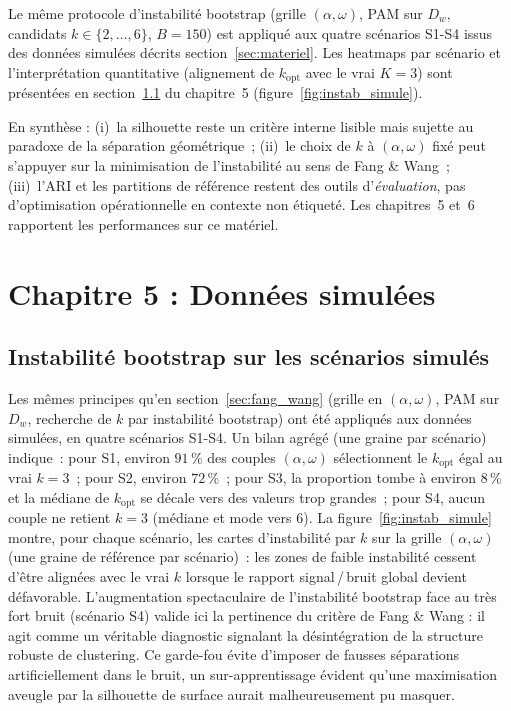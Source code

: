 \documentclass[11pt,a4paper]{article}
\newcommand{\Dw}{D_w}
\begin{document}
Le même protocole d'instabilité bootstrap (grille $(\alpha,\omega)$, PAM sur
$\Dw$, candidats $k\in\{2,\ldots,6\}$, $B=150$) est appliqué aux quatre
scénarios S1-S4 issus des données simulées décrits section~\ref{sec:materiel}. Les
heatmaps par scénario et l'interprétation quantitative (alignement de
$k_{\mathrm{opt}}$ avec le vrai $K=3$) sont présentées en
section~\ref{sec:instab_simule} du chapitre~5 (figure~\ref{fig:instab_simule}).

\medskip
\noindent
En synthèse : (i)~la silhouette reste un critère interne lisible mais sujette au
paradoxe de la séparation géométrique~; (ii)~le choix de $k$ à $(\alpha,\omega)$
fixé peut s'appuyer sur la minimisation de l'instabilité au sens de Fang \&
Wang~; (iii)~l'ARI et les partitions de référence restent des outils
d'\emph{évaluation}, pas d'optimisation opérationnelle en contexte non
étiqueté. Les chapitres~5 et~6 rapportent les performances sur ce matériel.

\section{Chapitre 5 : Données simulées}
\label{sec:chap5_donnees_simulees}

\subsection{Instabilité bootstrap sur les scénarios simulés}
\label{sec:instab_simule}

Les mêmes principes qu'en section~\ref{sec:fang_wang} (grille en $(\alpha,\omega)$,
PAM sur $\Dw$, recherche de $k$ par instabilité bootstrap) ont été appliqués aux
données simulées, en quatre scénarios S1-S4. Un bilan agrégé (une graine par scénario)
indique~: pour S1, environ $91\,\%$ des couples $(\alpha,\omega)$ sélectionnent le
$k_{\mathrm{opt}}$ égal au vrai $k=3$~; pour S2, environ $72\,\%$~; pour S3, la
proportion tombe à environ $8\,\%$ et la médiane de $k_{\mathrm{opt}}$ se
décale vers des valeurs trop grandes~; pour S4, aucun couple ne retient
$k=3$ (médiane et mode vers $6$). La figure~\ref{fig:instab_simule} montre, pour
chaque scénario, les cartes d'instabilité par $k$ sur la grille
$(\alpha,\omega)$ (une graine de référence par scénario)~: les zones de faible
instabilité cessent d'être alignées avec le vrai $k$ lorsque le rapport
signal\,/\,bruit global devient défavorable. L'augmentation spectaculaire de l'instabilité bootstrap face au très fort bruit (scénario S4) valide ici la pertinence du critère de Fang \& Wang : il agit comme un véritable diagnostic signalant la désintégration de la structure robuste de clustering. Ce garde-fou évite d'imposer de fausses séparations artificiellement dans le bruit, un sur-apprentissage évident qu'une maximisation aveugle par la silhouette de surface aurait malheureusement pu masquer.
\end{document}
